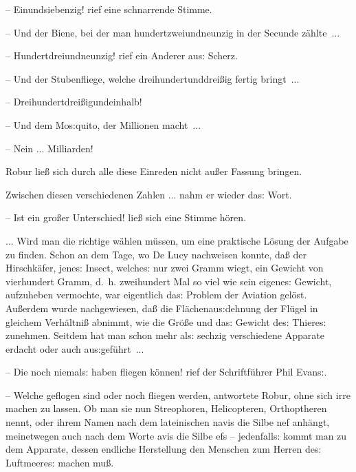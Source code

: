 \documentclass[oneside,12pt]{book}
\newenvironment{antiqua}{\normalfont}{}
\newcommand{\s}{s:}
\begin{document}
-- Einundsiebenzig! rief eine schnarrende Stimme.

-- Und der Biene, bei der man hundert\/zweiundneunzig in der Secunde
z\"ahlte~...

-- Hundertdreiundneunzig! rief ein Anderer au{\s} Scherz.

-- Und der Stubenfliege, welche dreihundertunddrei{\ss}ig fertig
bringt~...

-- Dreihundertdrei{\ss}igundeinhalb!

-- Und dem Mo{\s}quito, der Millionen macht~...

-- Nein ... Milliarden!{\grqq}

Robur lie{\ss} sich durch alle diese Einreden nicht au{\ss}er Fassung
bringen.

{\glqq}Zwischen diesen verschiedenen Zahlen ... nahm er wieder da{\s}
Wort.

-- Ist ein gro{\ss}er Unterschied! lie{\ss} sich eine Stimme h\"oren.

... Wird man die richtige w\"ahlen m\"ussen, um eine praktische
L\"osung der Aufgabe zu finden. Schon an dem Tage, wo De Lucy
nachweisen konnte, da{\ss} der Hirschk\"afer, jene{\s} Insect,
welche{\s} nur zwei Gramm wiegt, ein Gewicht von vierhundert Gramm,
d.~h. zweihundert Mal so viel wie sein eigene{\s} Gewicht, aufzuheben
vermochte, war eigentlich da{\s} Problem der Aviation gel\"ost.
Au{\ss}erdem wurde nachgewiesen, da{\ss} die Fl\"achenau{\s}dehnung
der Fl\"ugel in gleichem Verh\"altni{\ss} abnimmt, wie die
Gr\"o{\ss}e und da{\s} Gewicht de{\s} Thiere{\s} zunehmen. Seitdem
hat man schon mehr al{\s} sechzig verschiedene Apparate erdacht oder
auch au{\s}gef\"uhrt~...

-- Die noch niemal{\s} haben fliegen k\"onnen! rief der
Schriftf\"uhrer Phil Evan{\s}.

-- Welche geflogen sind oder noch fliegen werden, antwortete Robur,
ohne sich irre machen zu lassen. Ob man sie nun Streophoren,
Helicopteren, Orthoptheren nennt, oder ihrem Namen nach dem
lateinischen \begin{antiqua}navis\end{antiqua} die Silbe
{\glqq}\begin{antiqua}nef\end{antiqua}{\grqq} anh\"angt, meinetwegen
auch nach dem Worte \begin{antiqua}avis\end{antiqua} die Silbe
{\glqq}\begin{antiqua}efs\end{antiqua}{\grqq} -- jedenfall{\s}
kommt man zu dem Apparate, dessen endliche Herstellung den Menschen
zum Herren de{\s} Luftmeere{\s} machen mu{\ss}.
\end{document}
